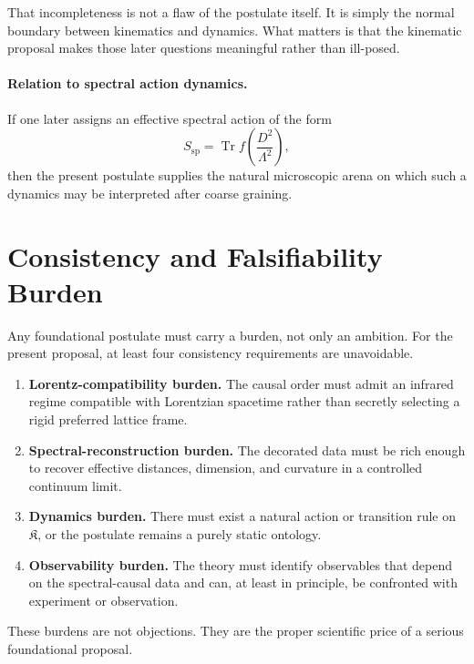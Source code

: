\documentclass[12pt,a4paper]{article}
\theoremstyle{postulate}
\newcommand{\Tr}{\operatorname{Tr}}
\newcommand{\Dirac}{D}
\newcommand{\Cut}{\Lambda}
\newcommand{\Kset}{\mathfrak{K}}
\begin{document}
That incompleteness is not a flaw of the postulate itself.  It is simply the
normal boundary between kinematics and dynamics.  What matters is that the
kinematic proposal makes those later questions meaningful rather than
ill-posed.

\paragraph{Relation to spectral action dynamics.}
If one later assigns an effective spectral action of the form
\begin{equation}
  S_{\mathrm{sp}} = \Tr f\!\left(\frac{\Dirac^2}{\Cut^2}\right),
  \label{eq:spectral-action}
\end{equation}
then the present postulate supplies the natural microscopic arena on which
such a dynamics may be interpreted after coarse graining.

\section{Consistency and Falsifiability Burden}
\label{sec:burden}

Any foundational postulate must carry a burden, not only an ambition.  For
the present proposal, at least four consistency requirements are unavoidable.

\begin{enumerate}[label=(\roman*)]
  \item \textbf{Lorentz-compatibility burden.} The causal order must admit an
  infrared regime compatible with Lorentzian spacetime rather than secretly
  selecting a rigid preferred lattice frame.
  \item \textbf{Spectral-reconstruction burden.} The decorated data must be
  rich enough to recover effective distances, dimension, and curvature in a
  controlled continuum limit.
  \item \textbf{Dynamics burden.} There must exist a natural action or
  transition rule on $\Kset$, or the postulate remains a purely static
  ontology.
  \item \textbf{Observability burden.} The theory must identify observables
  that depend on the spectral-causal data and can, at least in principle, be
  confronted with experiment or observation.
\end{enumerate}

These burdens are not objections.  They are the proper scientific price of a
serious foundational proposal.
\end{document}
